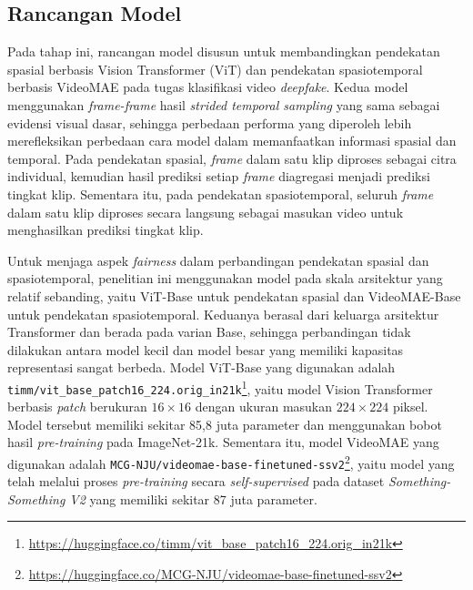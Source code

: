 \subsection{Rancangan Model}
Pada tahap ini, rancangan model disusun untuk membandingkan pendekatan spasial berbasis Vision Transformer (ViT) dan pendekatan spasiotemporal berbasis VideoMAE pada tugas klasifikasi video \textit{deepfake}. Kedua model menggunakan \textit{frame-frame} hasil \textit{strided temporal sampling} yang sama sebagai evidensi visual dasar, sehingga perbedaan performa yang diperoleh lebih merefleksikan perbedaan cara model dalam memanfaatkan informasi spasial dan temporal. Pada pendekatan spasial, \textit{frame} dalam satu klip diproses sebagai citra individual, kemudian hasil prediksi setiap \textit{frame} diagregasi menjadi prediksi tingkat klip. Sementara itu, pada pendekatan spasiotemporal, seluruh \textit{frame} dalam satu klip diproses secara langsung sebagai masukan video untuk menghasilkan prediksi tingkat klip. \par

Untuk menjaga aspek \textit{fairness} dalam perbandingan pendekatan spasial dan spasiotemporal, penelitian ini menggunakan model pada skala arsitektur yang relatif sebanding, yaitu ViT-Base untuk pendekatan spasial dan VideoMAE-Base untuk pendekatan spasiotemporal. Keduanya berasal dari keluarga arsitektur Transformer dan berada pada varian Base, sehingga perbandingan tidak dilakukan antara model kecil dan model besar yang memiliki kapasitas representasi sangat berbeda. Model ViT-Base yang digunakan adalah \texttt{timm/vit\_base\_patch16\_224.orig\_in21k}\footnote{\url{https://huggingface.co/timm/vit_base_patch16_224.orig_in21k}}, yaitu model Vision Transformer berbasis \textit{patch} berukuran $16 \times 16$ dengan ukuran masukan $224 \times 224$ piksel. Model tersebut memiliki sekitar 85,8 juta parameter dan menggunakan bobot hasil \textit{pre-training} pada ImageNet-21k. Sementara itu, model VideoMAE yang digunakan adalah \texttt{MCG-NJU/videomae-base-finetuned-ssv2}\footnote{\url{https://huggingface.co/MCG-NJU/videomae-base-finetuned-ssv2}}, yaitu model yang telah melalui proses \textit{pre-training} secara \textit{self-supervised} pada dataset \textit{Something-Something V2} yang memiliki sekitar 87 juta parameter. \par

